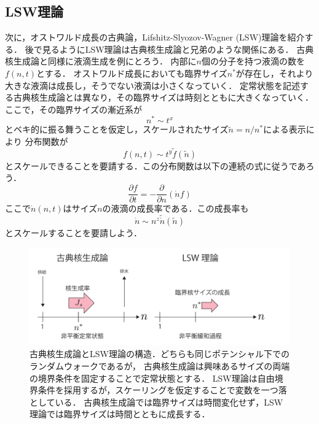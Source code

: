 \documentclass[topics,b5paper,papersize,twocolumn]{jsarticle}
\begin{document}
\subsection{LSW理論}

次に，オストワルド成長の古典論，Lifshitz-Slyozov-Wagner (LSW)理論を紹介する．
後で見るようにLSW理論は古典核生成論と兄弟のような関係にある．
古典核生成論と同様に液滴生成を例にとろう．
内部に$n$個の分子を持つ液滴の数を$f(n,t)$とする．
オストワルド成長においても臨界サイズ$n^*$が存在し，それより大きな液滴は成長し，そうでない液滴は小さくなっていく．
定常状態を記述する古典核生成論とは異なり，その臨界サイズは時刻とともに大きくなっていく．ここで，その臨界サイズの漸近系が
\begin{equation}
n^* \sim t^x
\end{equation}
とベキ的に振る舞うことを仮定し，スケールされたサイズ$\tilde{n}=n/n^*$による表示により
分布関数が
\begin{equation}
f(n,t) \sim t^y \tilde{f}(\tilde{n}) \label{eq_continuous}
\end{equation}
とスケールできることを要請する\cite{Binder}．この分布関数は以下の連続の式に従うであろう．
\begin{equation}
\frac{\partial f}{\partial t}=-\frac{\partial}{\partial n}(\dot{n} f)
\end{equation}
ここで$\dot{n}(n,t)$はサイズ$n$の液滴の成長率である．この成長率も
\begin{equation}
\dot{n} \sim n^z \tilde{\dot{n}}(\tilde{n})
\end{equation}
とスケールすることを要請しよう．

\begin{figure}[htbp]
\centering
\includegraphics[width=0.7\linewidth]{compare.pdf}
\caption{
古典核生成論とLSW理論の構造．どちらも同じポテンシャル下でのランダムウォークであるが，
古典核生成論は興味あるサイズの両端の境界条件を固定することで定常状態とする\cite{CNT}．
LSW理論は自由境界条件を採用するが，スケーリングを仮定することで変数を一つ落としている\cite{Binder}．
古典核生成論では臨界サイズは時間変化せず，LSW理論では臨界サイズは時間とともに成長する．
}\label{fig_compare}
\end{figure}
\end{document}
